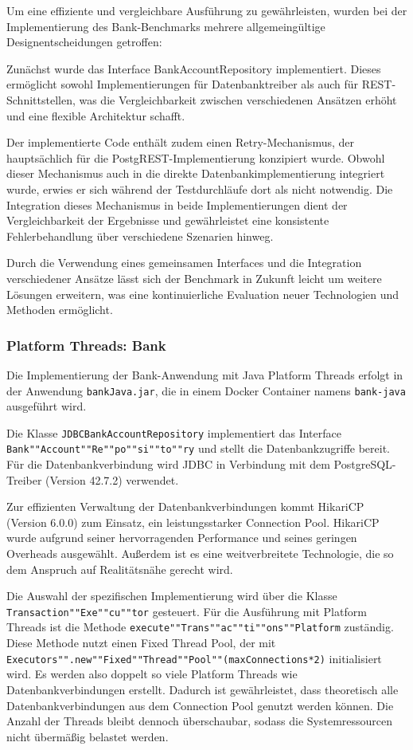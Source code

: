 \documentclass[fontsize=12pt,paper=a4,twoside=semi,parskip=half-,headsepline,headinclude]{scrreprt}
\begin{document}
Um eine effiziente und vergleichbare Aus\-füh\-rung zu gewährleisten, wurden bei der Implementierung des Bank-Bench\-marks  mehrere allgemeingültige Designentscheidungen getroffen:

Zunächst wurde das Interface BankAccountRepository implementiert. Dieses ermöglicht sowohl Implementierungen für Datenbanktreiber als auch für REST-Schnittstellen, was die Vergleichbarkeit zwischen verschiedenen Ansätzen erhöht und eine flexible Architektur schafft.

Der implementierte Code enthält zudem einen Retry-Mechanismus, der hauptsächlich für die PostgREST-Implementierung konzipiert wurde. Obwohl dieser Mechanismus auch in die direkte Datenbankimplementierung integriert wurde, erwies er sich während der Testdurchläufe dort als nicht notwendig. Die Integration dieses Mechanismus in beide Implementierungen dient der Vergleichbarkeit der Ergebnisse und gewährleistet eine konsistente Fehlerbehandlung über verschiedene Szenarien hinweg.

Durch die Verwendung eines gemeinsamen Interfaces und die Integration verschiedener Ansätze lässt sich der Benchmark in Zukunft leicht um weitere Lösungen erweitern, was eine kontinuierliche Evaluation neuer Technologien und Methoden ermöglicht.


\subsubsection{Platform Threads: Bank}

Die Implementierung der Bank-Anwendung mit Java Platform Threads erfolgt in der Anwendung \texttt{bankJava.jar}, die in einem Docker Container namens \texttt{bank-java} ausgeführt wird.

Die Klasse \texttt{JDBCBankAccountRepository} implementiert das Interface \texttt{Bank""Account""Re""po""si""to""ry} und stellt die Datenbankzugriffe bereit. Für die Datenbankverbindung wird JDBC in Verbindung mit dem PostgreSQL-Treiber (Version 42.7.2) verwendet. 

Zur effizienten Verwaltung der Datenbankverbindungen kommt HikariCP (Version 6.0.0) zum Einsatz, ein leistungsstarker Connection Pool. HikariCP wurde aufgrund seiner hervorragenden Performance und seines geringen Overheads ausgewählt. Außerdem ist es eine weitverbreitete Technologie, die so dem Anspruch auf Realitätsnähe gerecht wird.

Die Auswahl der spezifischen Implementierung wird über die Klasse \texttt{Transaction""Exe""cu""tor} gesteuert. Für die Ausführung mit Platform Threads ist die Methode \texttt{execute""Trans""ac""ti""ons""Platform} zuständig. Diese Methode nutzt einen Fixed Thread Pool, der mit \texttt{Executors"".new""Fixed""Thread""Pool""(maxConnections*2)} initialisiert wird. Es werden also doppelt so viele Platform Threads wie Datenbankverbindungen erstellt. Dadurch ist gewährleistet, dass theoretisch alle Datenbankverbindungen aus dem Connection Pool genutzt werden können. Die Anzahl der Threads bleibt dennoch überschaubar, sodass die Systemressourcen nicht übermäßig belastet werden.
\end{document}
